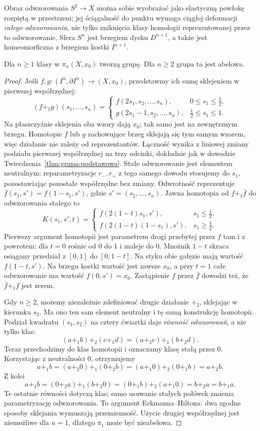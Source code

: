 Obraz odwzorowania $S^2\to X$ można sobie wyobrażać jako
elastyczną powłokę rozpiętą w przestrzeni; jej
ściągalność do punktu wymaga ciągłej deformacji
\emph{całego odwzorowania}, nie tylko zniknięcia klasy
homologii reprezentowanej przez to odwzorowanie. Sfera $S^n$ jest brzegiem dysku $D^{n+1}$,
a także jest homeomorficzna z brzegiem kostki $I^{n+1}$.

\begin{twierdzenie}
\label{thm:pi-n-abelowe}
Dla $n\geq1$ klasy w $\pi_n(X,x_0)$ tworzą grupę.
Dla $n\geq2$ grupa ta jest abelowa.
\end{twierdzenie}
\begin{proof}
Jeśli $f,g:(I^n,\partial I^n)\to(X,x_0)$,
przedstawmy ich sumę sklejeniem w pierwszej
współrzędnej:
\[
 (f+_1g)(s_1,\ldots,s_n)=
 \begin{cases}
 f(2s_1,s_2,\ldots,s_n),&0\leq s_1\leq\tfrac12,\\
 g(2s_1-1,s_2,\ldots,s_n),&\tfrac12\leq s_1\leq1.
 \end{cases}
\]
Na płaszczyźnie sklejenia oba wzory dają
$x_0$; tak samo jest na zewnętrznym brzegu.
Homotopie $f$ lub $g$ zachowujące brzeg
sklejają się tym samym wzorem, więc działanie
nie zależy od reprezentantów. Łączność
wynika z liniowej zmiany podziału pierwszej
współrzędnej na trzy odcinki, dokładnie jak
w dowodzie Twierdzenia~\ref{thm:grupa-podstawowa}.
Stałe odwzorowanie jest elementem neutralnym:
reparametryzacje $r_-,r_+$ z tego samego dowodu stosujemy
do $s_1$, pozostawiając pozostałe współrzędne bez zmiany.
Odwrotność reprezentuje $\bar f(s_1,s')=f(1-s_1,s')$,
gdzie $s'=(s_2,\ldots,s_n)$. Jawna homotopia od
$f+_1\bar f$ do odwzorowania stałego to
\[
 K(s_1,s',t)=
 \begin{cases}
 f(2(1-t)s_1,s'),&s_1\leq\tfrac12,\\
 f(2(1-t)(1-s_1),s'),&s_1\geq\tfrac12.
 \end{cases}
\]
Pierwszy argument homotopii jest parametrem drogi
przebytej przez $f$ tam i z powrotem: dla $t=0$ rośnie
od $0$ do $1$ i maleje do $0$. Mnożnik $1-t$ skraca
osiągany przedział z $[0,1]$ do $[0,1-t]$.
Na styku obie gałęzie mają wartość $f(1-t,s')$.
Na brzegu kostki wartość jest zawsze $x_0$, a przy $t=1$
całe odwzorowanie ma wartość $f(0,s')=x_0$.
Zastąpienie $f$ przez $\bar f$ dowodzi też, że $\bar f+_1f$ jest zerem.

Gdy $n\geq2$, możemy niezależnie zdefiniować
drugie działanie $+_2$, sklejając w kierunku
$s_2$. Ma ono ten sam element neutralny
i tę samą konstrukcję homotopii. Podział
kwadratu $(s_1,s_2)$ na cztery ćwiartki
daje \emph{równość odwzorowań}, a nie tylko klas:
\[
 (a+_1 b)+_2(c+_1d)
   =(a+_2c)+_1(b+_2d).
\]
Teraz przechodzimy do klas homotopii i oznaczamy klasę stałą przez $0$.
Korzystając z neutralności $0$, otrzymujemy
\[
 a+_1b=(a+_2 0)+_1(0+_2 b)
      =(a+_1 0)+_2(0+_1 b)=a+_2b.
\]
Z kolei
\[
 a+_1b=(0+_2a)+_1(b+_2 0)
      =(0+_1b)+_2(a+_1 0)=b+_2a=b+_1a.
\]
Te ostatnie równości dotyczą klas; samo usuwanie stałych połówek
zmienia parametryzację odwzorowania.
To argument Eckmanna--Hiltona: dwa
zgodne sposoby sklejania wymuszają
przemienność. Użycie drugiej
współrzędnej jest niemożliwe dla
$n=1$, dlatego $\pi_1$ może być
nieabelowa.
\end{proof}

